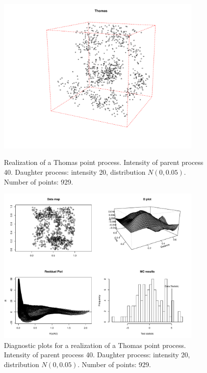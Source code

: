 \documentclass{article}
\begin{document}
\begin{figure}[p]
  \centering
    \includegraphics[width=0.9\textwidth]{PP_Thomas_40_20_0p05_929.pdf}
  \caption{Realization of a Thomas point process. Intensity of parent process 40. Daughter process: intensity 20, distribution $N(0,0.05)$. Number of points: 929.}
  \label{fig:thomas2PP}

\vspace*{\floatsep}

    \includegraphics[width=0.9\textwidth]{diag_Thomas_40_20_0p05_929.pdf}
  \caption{Diagnostic plots for a realization of a Thomas point process. Intensity of parent process 40. Daughter process: intensity 20, distribution $N(0,0.05)$. Number of points: 929.}
  \label{fig:thomas2Diag}
\end{figure}
\end{document}
